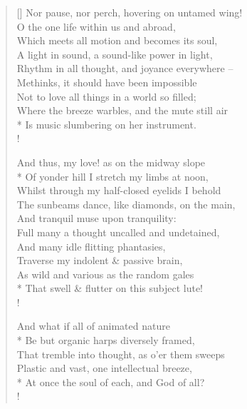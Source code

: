\documentclass[MAIN]{subfiles}
\begin{document}
\begin{verse}[\versewidth]
Nor pause, nor perch, hovering on untamed wing!\\
O the one life within us and abroad,\\
Which meets all motion and becomes its soul,\\
A light in sound, a sound-like power in light,\\
Rhythm in all thought, and joyance everywhere --\\
Methinks, it should have been impossible\\
Not to love all things in a world so filled;\\
Where the breeze warbles, and the mute still air\\*
Is music slumbering on her instrument.\\!

And thus, my love! as on the midway slope\\* 
Of yonder hill I stretch my limbs at noon,\\
Whilst through my half-closed eyelids I behold\\ 
The sunbeams dance, like diamonds, on the main,\\
And tranquil muse upon tranquility:\\
Full many a thought uncalled and undetained,\\
And many idle flitting phantasies,\\
Traverse my indolent \& passive brain,\\
As wild and various as the random gales\\*
That swell \& flutter on this subject lute!\\!

And what if all of animated nature\\*
Be but organic harps diversely framed,\\
That tremble into thought, as o'er them sweeps\\ 
Plastic and vast, one intellectual breeze,\\*
At once the soul of each, and God of all?\\!


\end{verse}
\end{document}
